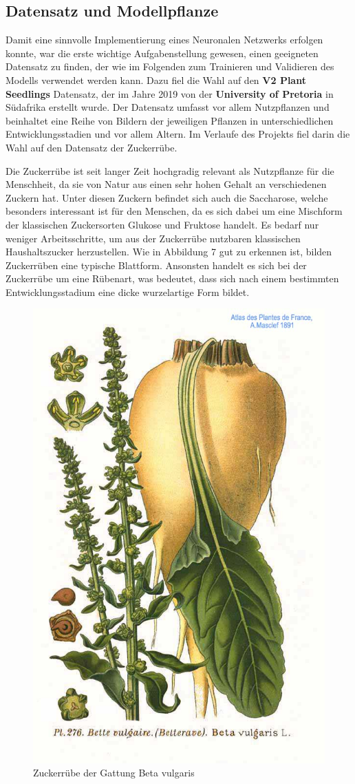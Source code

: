 \subsection{Datensatz und Modellpflanze}
Damit eine sinnvolle Implementierung eines Neuronalen Netzwerks erfolgen konnte, war die erste wichtige Aufgabenstellung gewesen, einen geeigneten Datensatz zu finden, der wie im Folgenden zum Trainieren und Validieren des Modells verwendet werden kann. Dazu fiel die Wahl auf den \textbf{V2 Plant Seedlings} Datensatz, der im Jahre 2019 von der \textbf{University of Pretoria} in Südafrika erstellt wurde. Der Datensatz umfasst vor allem Nutzpflanzen und beinhaltet eine Reihe von Bildern der jeweiligen Pflanzen in unterschiedlichen Entwicklungsstadien und vor allem Altern. Im Verlaufe des Projekts fiel darin die Wahl auf den Datensatz der Zuckerrübe. \newline \par
Die Zuckerrübe ist seit langer Zeit hochgradig relevant als Nutzpflanze für die Menschheit, da sie von Natur aus einen sehr hohen Gehalt an verschiedenen Zuckern hat. Unter diesen Zuckern befindet sich auch die Saccharose, welche besonders interessant ist für den Menschen, da es sich dabei um eine Mischform der klassischen Zuckersorten Glukose und Fruktose handelt. Es bedarf nur weniger Arbeitsschritte, um aus der Zuckerrübe nutzbaren klassischen Haushaltszucker herzustellen. Wie in Abbildung 7 gut zu erkennen ist, bilden Zuckerrüben eine typische Blattform. Ansonsten handelt es sich bei der Zuckerrübe um eine Rübenart, was bedeutet, dass sich nach einem bestimmten Entwicklungsstadium eine dicke wurzelartige Form bildet.
\begin{figure}
    \centering
    \includegraphics[width=0.4\linewidth]{276_Beta_vulgaris_L.jpg}
    \caption{Zuckerrübe der Gattung Beta vulgaris}
    \label{fig:enter-label}
\end{figure} 
